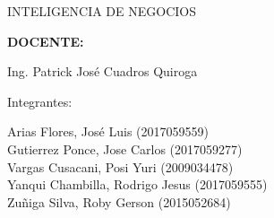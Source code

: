 \documentclass[12pt,letterpaper]{article}
\begin{document}
\begin{titlepage}
\begin{center}
\begin{large}
                INTELIGENCIA DE NEGOCIOS\\
            \end{large}
            \vspace*{0.3in}
            \begin{Large}
                \textbf{DOCENTE:} \\
            \end{Large}
            \vspace*{0.1in}
            \begin{large}
                Ing. Patrick José Cuadros Quiroga\\
            \end{large}
            \vspace*{0.2in}
            \vspace*{0.1in}
            \begin{large}
                Integrantes: \\
                \begin{flushleft}
                    Arias Flores, José Luis 			\hfill	(2017059559) \\
                    Gutierrez Ponce, Jose Carlos  		\hfill	(2017059277) \\
                    Vargas Cusacani, Posi Yuri  		\hfill	(2009034478) \\
                    Yanqui Chambilla, Rodrigo Jesus  	\hfill	(2017059555) \\
                    Zuñiga Silva, Roby Gerson       	\hfill	(2015052684) \\
                \end{flushleft}
            \end{large}
        \end{center}
    \end{titlepage}
\end{document}
